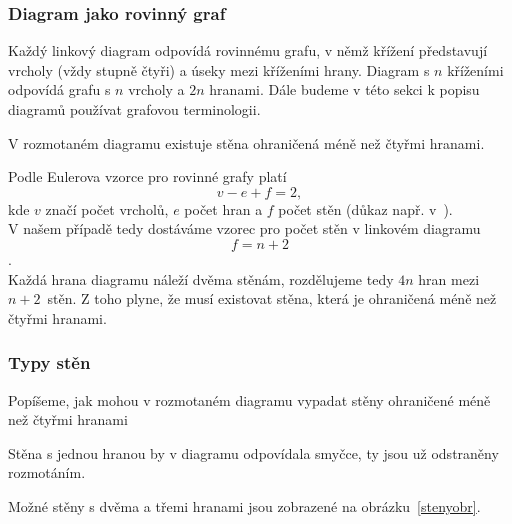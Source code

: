 \subsubsection{Diagram jako rovinný graf} \label{jakograf}
Každý linkový diagram odpovídá rovinnému grafu, v němž křížení představují vrcholy (vždy stupně čtyři) a úseky mezi kříženími hrany. Diagram s $n$ kříženími odpovídá grafu s $n$ vrcholy a $2n$ hranami.
Dále budeme v této sekci k popisu diagramů používat grafovou terminologii. 

\begin{lemma}
V rozmotaném diagramu existuje stěna ohraničená méně než čtyřmi hranami.
\end{lemma}

\begin{dukaz}
Podle Eulerova vzorce pro rovinné grafy platí $$v - e +f = 2,$$ kde $v$ značí počet vrcholů, $e$ počet hran a $f$ počet stěn (důkaz např. v~\cite{kapitoly}).
\\
V našem případě tedy dostáváme vzorec pro počet stěn v linkovém diagramu $$f = n+2$$.
\\
Každá hrana diagramu náleží dvěma stěnám, rozdělujeme tedy $4n$ hran mezi $n+2$~stěn. Z toho plyne, že musí existovat stěna, která je ohraničená méně než čtyřmi hranami. 
\end{dukaz} 

\subsubsection{Typy stěn} \label{steny}



Popíšeme, jak mohou v rozmotaném diagramu vypadat stěny ohraničené méně než čtyřmi hranami

Stěna s jednou hranou by v diagramu odpovídala smyčce, ty jsou už odstraněny rozmotáním.

Možné stěny s dvěma a třemi hranami jsou zobrazené na obrázku~\ref{stenyobr}.

